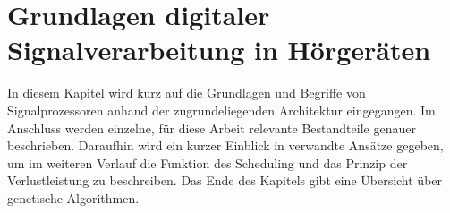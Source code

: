 \chapter{Grundlagen digitaler Signalverarbeitung in Hörgeräten}
\label{chap:grundlagen}
In diesem Kapitel wird kurz auf die Grundlagen und Begriffe von Signalprozessoren anhand der zugrundeliegenden Architektur eingegangen. Im Anschluss werden einzelne, für diese Arbeit relevante Bestandteile genauer beschrieben. Daraufhin wird ein kurzer Einblick in verwandte Ansätze gegeben, um im weiteren Verlauf die Funktion des Scheduling und das Prinzip der Verlustleistung zu beschreiben. Das Ende des Kapitels gibt eine Übersicht über genetische Algorithmen.




